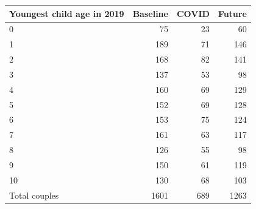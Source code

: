 
\begin{tabular}{lrrr}
\toprule
Youngest child age in 2019 & Baseline & COVID & Future\\
\midrule
0 & 75 & 23 & 60\\
1 & 189 & 71 & 146\\
2 & 168 & 82 & 141\\
3 & 137 & 53 & 98\\
4 & 160 & 69 & 129\\
5 & 152 & 69 & 128\\
6 & 153 & 75 & 124\\
7 & 161 & 63 & 117\\
8 & 126 & 55 & 98\\
9 & 150 & 61 & 119\\
10 & 130 & 68 & 103\\
Total couples & 1601 & 689 & 1263\\
\bottomrule
\end{tabular}
